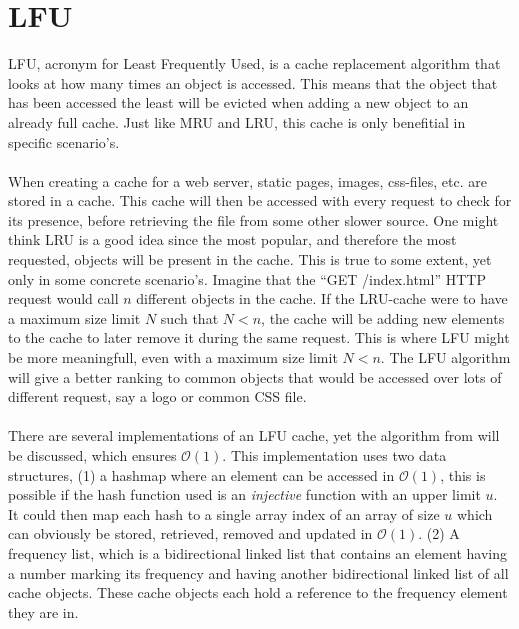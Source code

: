 \documentclass[pdftex,a4paper,12pt,twoside]{report}
\begin{document}
\section{LFU}
LFU, acronym for Least Frequently Used, is a cache replacement algorithm that looks at how many times an object is accessed. This means that the object that has been accessed the least will be evicted when adding a new object to an already full cache. Just like MRU and LRU, this cache is only benefitial in specific scenario's.
\\\\
When creating a cache for a web server, static pages, images, css-files, etc. are stored in a cache. This cache will then be accessed with every request to check for its presence, before retrieving the file from some other slower source. One might think LRU is a good idea since the most popular, and therefore the most requested, objects will be present in the cache. This is true to some extent, yet only in some concrete scenario's. Imagine that the ``GET /index.html'' HTTP request would call $n$ different objects in the cache. If the LRU-cache were to have a maximum size limit $N$ such that $N < n$, the cache will be adding new elements to the cache to later remove it during the same request. This is where LFU might be more meaningfull, even with a maximum size limit $N < n$. The LFU algorithm will give a better ranking to common objects that would be accessed over lots of different request, say a logo or common CSS file.
\\\\
There are several implementations of an LFU cache, yet the algorithm from \cite{shah20101} will be discussed, which ensures $\mathcal{O}(1)$.
This implementation uses two data structures, (1) a hashmap where an element can be accessed in $\mathcal{O}(1)$, this is possible if the hash function used is an 
\emph{injective} function with an upper limit $u$. It could then map each hash to a single array index of an array of size $u$ which can obviously be stored, retrieved, removed and updated in $\mathcal{O}(1)$. (2) A frequency list, which is a bidirectional linked list that contains an element having a number marking its frequency and having another bidirectional linked list of all cache objects. These cache objects each hold a reference to the frequency element they are in.
\end{document}
